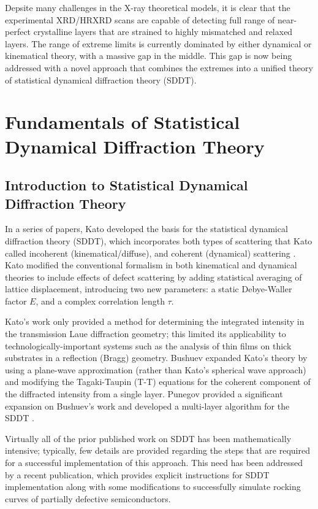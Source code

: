 Depsite many challenges in the X-ray theoretical models, it is clear that the experimental XRD/HRXRD scans are capable of detecting full range of near-perfect crystalline layers that are strained to highly mismatched and relaxed layers.  The range of extreme limits is currently dominated by either dynamical or kinematical theory, with a massive gap in the middle.  This gap is now being addressed with a novel approach that combines the extremes into a unified theory of statistical dynamical diffraction theory (SDDT).


\chapter{Fundamentals of Statistical Dynamical Diffraction Theory}

	\section{Introduction to Statistical Dynamical Diffraction Theory}

In a series of papers, Kato developed the basis for the statistical dynamical diffraction theory (SDDT), which incorporates both types of scattering that Kato called incoherent (kinematical/diffuse), and coherent (dynamical) scattering \cite{KatoI,KatoII,KatoIII,KatoIV,Kato2,Kato1}. Kato modified the conventional formalism in both kinematical and dynamical theories to include effects of defect scattering by adding statistical averaging of lattice displacement, introducing two new parameters: a static Debye-Waller factor $E$, and a complex correlation length $\tau$.

Kato's work only provided a method for determining the integrated intensity in the transmission Laue diffraction geometry; this limited its applicability to technologically-important systems such as the analysis of thin films on thick substrates in a reflection (Bragg) geometry.  Bushuev \cite{Bushuev1,Bushuev2} expanded Kato's theory by using a plane-wave approximation (rather than Kato's spherical wave approach) and modifying the Tagaki-Taupin (T-T) equations \cite{Takagi1,Taupin1,Takagi2} for the coherent component of the diffracted intensity from a single layer. Punegov provided a significant expansion on Bushuev's work \cite{Punegov1,Punegov12,Punegov13,Punegov2,Punegov9} and developed a multi-layer algorithm for the SDDT \cite{Punegov15}.

Virtually all of the prior published work on SDDT has been mathematically intensive; typically, few details are provided regarding the steps that are required for a successful implementation of this approach.  This need has been addressed by a recent publication\cite{Shreeman1}, which provides explicit instructions for SDDT implementation along with some modifications to successfully simulate rocking curves of partially defective semiconductors.



